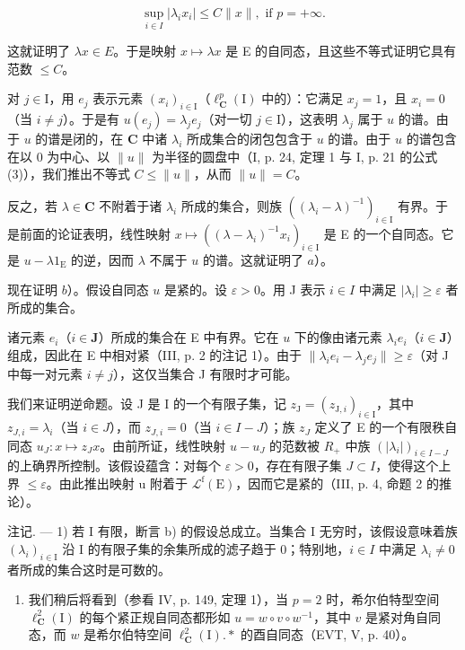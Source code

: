 \[
\sup _ {i \in I} | \lambda_ {i} x _ {i} | \leqslant C \| x \|, \text {   if   } p = + \infty .
\]

这就证明了 \(\lambda x \in E\)。于是映射 \(x \mapsto \lambda x\) 是 E 的自同态，且这些不等式证明它具有范数 \(\leqslant C\)。

对 \(j \in \mathrm{I}\)，用 \(e_j\) 表示元素 \((x_i)_{i \in \mathrm{I}}\)（\(\ell_{\mathbf{C}}^p(\mathrm{I})\) 中的）：它满足 \(x_j = 1\)，且 \(x_i = 0\)（当 \(i \neq j\)）。于是有 \(u(e_j) = \lambda_j e_j\)（对一切 \(j \in \mathrm{I}\)），这表明 \(\lambda_j\) 属于 \(u\) 的谱。由于 \(u\) 的谱是闭的，在 \(\mathbf{C}\) 中诸 \(\lambda_i\) 所成集合的闭包包含于 \(u\) 的谱。由于 \(u\) 的谱包含在以 0 为中心、以 \(\|u\|\) 为半径的圆盘中（I, p. 24, 定理 1 与 I, p. 21 的公式 (3)），我们推出不等式 \(C \leqslant \|u\|\)，从而 \(\|u\| = C\)。

反之，若 \(\lambda \in \mathbf{C}\) 不附着于诸 \(\lambda_{i}\) 所成的集合，则族 \(((\lambda_{i} - \lambda)^{-1})_{i\in \mathrm{I}}\) 有界。于是前面的论证表明，线性映射 \(x\mapsto ((\lambda -\lambda_i)^{-1}x_i)_{i\in \mathrm{I}}\) 是 E 的一个自同态。它是 \(u - \lambda 1_{\mathrm{E}}\) 的逆，因而 \(\lambda\) 不属于 \(u\) 的谱。这就证明了 \(a\)）。

现在证明 \(b\)）。假设自同态 \(u\) 是紧的。设 \(\varepsilon > 0\)。用 J 表示 \(i \in I\) 中满足 \(|\lambda_i| \geqslant \varepsilon\) 者所成的集合。

诸元素 \(e_i\)（\(i \in \mathbf{J}\)）所成的集合在 E 中有界。它在 \(u\) 下的像由诸元素 \(\lambda_i e_i\)（\(i \in \mathbf{J}\)）组成，因此在 E 中相对紧（III, p. 2 的注记 1）。由于 \(\| \lambda_i e_i - \lambda_j e_j \| \geqslant \varepsilon\)（对 J 中每一对元素 \(i \neq j\)），这仅当集合 J 有限时才可能。

我们来证明逆命题。设 J 是 I 的一个有限子集，记 \(z_{\mathrm{J}} = (z_{\mathrm{J},i})_{i \in \mathrm{I}}\)，其中 \(z_{J,i} = \lambda_i\)（当 \(i \in J\)），而 \(z_{J,i} = 0\)（当 \(i \in I - J\)）；族 \(z_J\) 定义了 E 的一个有限秩自同态 \(u_J \colon x \mapsto z_J x\)。由前所证，线性映射 \(u - u_J\) 的范数被 \(R_+\) 中族 \((|\lambda_i|)_{i \in I-J}\) 的上确界所控制。该假设蕴含：对每个 \(\varepsilon > 0\)，存在有限子集 \(J \subset I\)，使得这个上界 \(\leqslant \varepsilon\)。由此推出映射 u 附着于 \(\mathcal{L}^{\mathrm{f}}(\mathrm{E})\)，因而它是紧的（III, p. 4, 命题 2 的推论）。

注记. --- 1) 若 I 有限，断言 b) 的假设总成立。当集合 I 无穷时，该假设意味着族 \((\lambda_{i})_{i\in\mathrm{I}}\) 沿 I 的有限子集的余集所成的滤子趋于 0；特别地，\(i\in I\) 中满足 \(\lambda_{i}\neq0\) 者所成的集合这时是可数的。

\begin{enumerate}
\def\labelenumi{\arabic{enumi})}
\setcounter{enumi}{1}
\tightlist
\item
  我们稍后将看到（参看 IV, p. 149, 定理 1），当 \(p = 2\) 时，希尔伯特型空间 \(\ell_{\mathbf{C}}^{2}(\mathrm{I})\) 的每个紧正规自同态都形如 \(u = w \circ v \circ w^{-1}\)，其中 \(v\) 是紧对角自同态，而 \(w\) 是希尔伯特空间 \(\ell_{\mathbf{C}}^{2}(\mathrm{I}).*\) 的酉自同态（EVT, V, p. 40）。
\end{enumerate}

